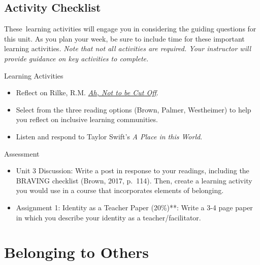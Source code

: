 \documentclass[
]{book}
\providecommand{\tightlist}{%
  \setlength{\itemsep}{0pt}\setlength{\parskip}{0pt}}
\begin{document}
\hypertarget{activity-checklist-2}{%
\subsection*{Activity Checklist}\label{activity-checklist-2}}

These~learning activities will engage you in considering the guiding questions for this unit. As you plan your week, be sure to include time for these important learning activities. \emph{Note that not all activities are required. Your instructor will provide guidance on key activities to complete.}

\begin{reflect}
{Learning Activities}

\begin{itemize}
\tightlist
\item
  Reflect on Rilke, R.M.
  \href{https://gladdestthing.com/poems/ah-not-to-be-cut-off}{\emph{Ah,
  Not to be Cut Off}}.\\
\item
  Select from the three reading options (Brown, Palmer, Westheimer) to
  help you reflect on inclusive learning communities.\\
\item
  Listen and respond to Taylor Swift's \emph{A Place in this World}.
\end{itemize}
\end{reflect}

\begin{assessment}
{Assessment}

\begin{itemize}
\tightlist
\item
  Unit 3 Discussion: Write a post in response to your readings,
  including the BRAVING checklist (Brown, 2017, p.~114). Then, create a
  learning activity you would use in a course that incorporates elements
  of belonging.\\
\item
  Assignment 1: Identity as a Teacher Paper (20\%)**: Write a 3-4 page
  paper in which you describe your identity as a teacher/facilitator.
\end{itemize}
\end{assessment}

\hypertarget{belonging-to-others-1}{%
\section{Belonging to Others}\label{belonging-to-others-1}}
\end{document}
